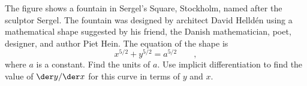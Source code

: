 The figure shows a fountain in Sergel's Square, Stockholm, named after
the sculptor Sergel. The fountain was designed by 
architect David Helld\'en using a mathematical shape suggested by his friend,
the Danish mathematician,
poet, designer, and author Piet Hein. The equation of the shape is
\begin{equation*}
  x^{5/2}+y^{5/2} = a^{5/2} \qquad ,
\end{equation*}
where $a$ is a constant. Find the units of $a$. Use implicit differentiation to find
the value of $\der y/\der x$ for this curve in terms of $y$ and $x$.
